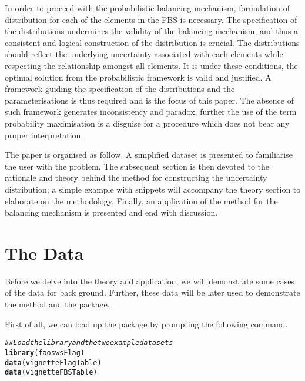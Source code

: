 \documentclass[nojss]{jss}\usepackage[]{graphicx}\usepackage[]{color}
\makeatletter
\newcommand{\hlcom}[1]{\textcolor[rgb]{0.678,0.584,0.686}{\textit{#1}}}%
\newcommand{\hlstd}[1]{\textcolor[rgb]{0.345,0.345,0.345}{#1}}%
\newcommand{\hlkwd}[1]{\textcolor[rgb]{0.737,0.353,0.396}{\textbf{#1}}}%
\newenvironment{kframe}{%
 \def\at@end@of@kframe{}%
 \ifinner\ifhmode%
  \def\at@end@of@kframe{\end{minipage}}%
  \begin{minipage}{\columnwidth}%
 \fi\fi%
 \def\FrameCommand##1{\hskip\@totalleftmargin \hskip-\fboxsep
 \colorbox{shadecolor}{##1}\hskip-\fboxsep
     \hskip-\linewidth \hskip-\@totalleftmargin \hskip\columnwidth}%
 \MakeFramed {\advance\hsize-\width
   \@totalleftmargin\z@ \linewidth\hsize
   \@setminipage}}%
 {\par\unskip\endMakeFramed%
 \at@end@of@kframe}
\newenvironment{knitrout}{}{} %
\makeatother
\begin{document}
In order to proceed with the probabilistic balancing mechanism,
formulation of distribution for each of the elements in the FBS is
necessary. The specification of the distributions undermines the
validity of the balancing mechanism, and thus a consistent and logical
construction of the distribution is crucial. The distributions should
reflect the underlying uncertainty associated with each elements while
respecting the relationship amongst all elements. It is under these
conditions, the optimal solution from the probabilistic framework is
valid and justified. A framework guiding the specification of the
distributions and the parameterisations is thus required and is the
focus of this paper. The absence of such framework generates
inconsistency and paradox, further the use of the term probability
maximisation is a disguise for a procedure which does not bear any
proper interpretation.


The paper is organised as follow. A simplified dataset is presented to
familiarise the user with the problem. The subsequent section is then
devoted to the rationale and theory behind the method for constructing
the uncertainty distribution; a simple example with snippets will
accompany the theory section to elaborate on the methodology. Finally,
an application of the method for the balancing mechanism is presented
and end with discussion.




\section{The Data}

Before we delve into the theory and application, we will demonstrate
some cases of the data for back ground. Further, these data will be
later used to demonstrate the method and the package.


First of all, we can load up the package by prompting the following command.

\begin{knitrout}
\color{fgcolor}\begin{kframe}
\begin{alltt}
\hlcom{## Load the library and the two example datasets}
\hlkwd{library}\hlstd{(faoswsFlag)}
\hlkwd{data}\hlstd{(vignetteFlagTable)}
\hlkwd{data}\hlstd{(vignetteFBSTable)}
\end{alltt}
\end{kframe}
\end{knitrout}
\end{document}
